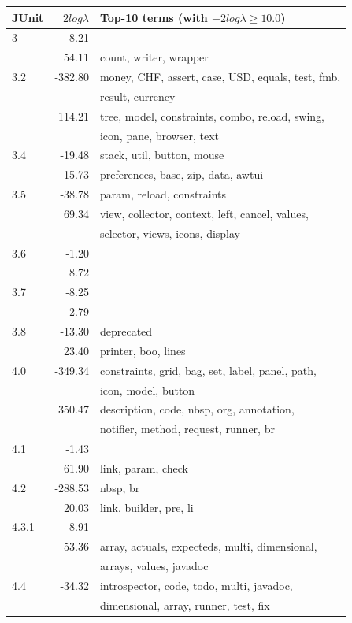 \documentclass[10pt]{book}
\begin{document}
\begin{table}
{\scriptsize \begin{center}
\begin{tabular}{lrl}
\textbf{JUnit} & $2log\lambda$ & \textbf{Top-10 terms (with $-2log\lambda \geqslant10.0$)} \\
\hline
3 & -8.21 &  \\
~ & 54.11 & count, writer, wrapper \\
\hline
3.2 & -382.80 & money, CHF, assert, case, USD, equals, test, fmb,\\~&~& result, currency \\
~ & 114.21 & tree, model, constraints, combo, reload, swing,\\~&~& icon, pane, browser, text \\
\hline
3.4 & -19.48 & stack, util, button, mouse \\
~ & 15.73 & preferences, base, zip, data, awtui \\
\hline
3.5 & -38.78 & param, reload, constraints \\
~ & 69.34 & view, collector, context, left, cancel, values,\\~&~& selector, views, icons, display \\
\hline
3.6 & -1.20 &  \\
~ & 8.72 &  \\
\hline
3.7 & -8.25 &  \\
~ & 2.79 &  \\
\hline
3.8 & -13.30 & deprecated \\
~ & 23.40 & printer, boo, lines \\
\hline
4.0 & -349.34 & constraints, grid, bag, set, label, panel, path,\\~&~& icon, model, button \\
~ & 350.47 & description, code, nbsp, org, annotation,\\~&~& notifier, method, request, runner, br \\
\hline
4.1 & -1.43 &  \\
~ & 61.90 & link, param, check \\
\hline
4.2 & -288.53 & nbsp, br \\
~ & 20.03 & link, builder, pre, li \\
\hline
4.3.1 & -8.91 &  \\
~ & 53.36 & array, actuals, expecteds, multi, dimensional,\\~&~& arrays, values, javadoc \\
\hline
4.4 & -34.32 & introspector, code, todo, multi, javadoc,\\~&~& dimensional, array, runner, test, fix \\

\end{tabular}
\end{center}}
\end{table}
\end{document}
